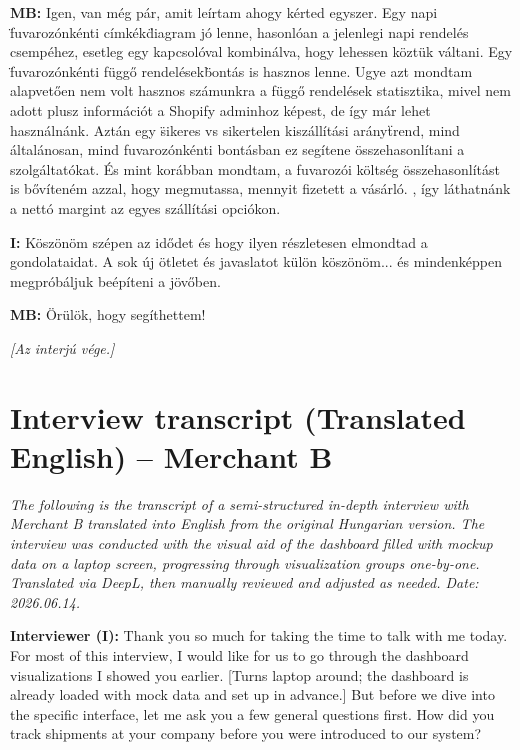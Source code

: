 \documentclass{imc-inf}
\begin{document}
\begin{appendices}
  \noindent\textbf{MB:} Igen, van még pár, amit leírtam ahogy kérted egyszer. Egy napi \"fuvarozónkénti címkék\" diagram jó lenne, hasonlóan a jelenlegi napi rendelés csempéhez, esetleg egy kapcsolóval kombinálva, hogy lehessen köztük váltani. Egy \"fuvarozónkénti függő rendelések\" bontás is hasznos lenne. Ugye azt mondtam alapvetően nem volt hasznos számunkra a függő rendelések statisztika, mivel nem adott plusz információt a Shopify adminhoz képest, de így már lehet használnánk.  Aztán egy \"sikeres vs sikertelen kiszállítási arány\" trend, mind általánosan, mind fuvarozónkénti bontásban ez segítene összehasonlítani a szolgáltatókat. És mint korábban mondtam, a fuvarozói költség összehasonlítást is bővíteném azzal, hogy megmutassa, mennyit fizetett a vásárló. , így láthatnánk a nettó margint az egyes szállítási opciókon.

  \noindent\textbf{I:} Köszönöm szépen az idődet és hogy ilyen részletesen elmondtad a gondolataidat. A sok új ötletet és javaslatot külön köszönöm... és mindenképpen megpróbáljuk beépíteni a jövőben.

  \noindent\textbf{MB:} Örülök, hogy segíthettem!

  \bigskip
  \noindent\textit{[Az interjú vége.]}


  \chapter{Interview transcript (Translated English) -- Merchant B}
  \label{app:interview-merchant-b-english}

  \noindent\textit{The following is the transcript of a semi-structured in-depth interview with Merchant B translated into English from the original Hungarian version. The interview was conducted with the visual aid of the dashboard filled with mockup data on a laptop screen, progressing through visualization groups one-by-one. Translated via DeepL, then manually reviewed and adjusted as needed. Date:  2026.06.14.}

  \bigskip
  \noindent\textbf{Interviewer (I):} Thank you so much for taking the time to talk with me today. For most of this interview, I would like for us to go through the dashboard visualizations I showed you earlier. [Turns laptop around; the dashboard is already loaded with mock data and set up in advance.] But before we dive into the specific interface, let me ask you a few general questions first. How did you track shipments at your company before you were introduced to our system?


\end{appendices}
\end{document}
